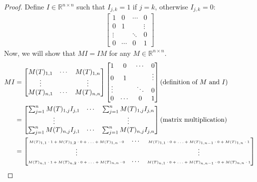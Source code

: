 \documentclass[12pt,reqno]{article}
\theoremstyle{definition}
\begin{document}
\begin{proof}
    Define $I \in \mathbb{R}^{n\times n}$ such that $I_{j,k} = 1$ if $j = k$, otherwise $I_{j,k} = 0$:
    \begin{align*}
        \begin{bmatrix}
            1 & 0 & \cdots & 0\\
            0 & 1 & & \vdots \\
            \vdots &  & \ddots & 0\\
            0 & \cdots & 0 & 1
        \end{bmatrix}
    \end{align*}
    Now, we will show that $MI=IM$ for any $M \in \mathbb{R}^{n\times n}$.
    \begin{align*}
        MI &=
        \begin{bmatrix}
            M(T)_{1,1} & \cdots & M(T)_{1,n}\\
            \vdots & & \vdots\\
            M(T)_{n,1} & \cdots & M(T)_{n,n}
        \end{bmatrix}
        \begin{bmatrix}
            1 & 0 & \cdots & 0\\
            0 & 1 & & \vdots \\
            \vdots &  & \ddots & 0\\
            0 & \cdots & 0 & 1
        \end{bmatrix}
        \text{(definition of $M$ and $I$)}\\
        &=
        \begin{bmatrix}
            \sum_{j=1}^{n}M(T)_{1,j}I_{j,1} & \cdots & \sum_{j=1}^{n}M(T)_{1,j}I_{j,n}\\
            \vdots & & \vdots \\
            \sum_{j=1}^{n}M(T)_{n,j}I_{j,1} & \cdots & \sum_{j=1}^{n}M(T)_{n,j}I_{j,n}
        \end{bmatrix}
        \text{(matrix multiplication)}\\
        &=
        \begin{bmatrix}
            \text{\tiny{$M(T)_{1,1}\cdot 1+M(T)_{1,2}\cdot 0+\ldots+M(T)_{1,n}\cdot 0$}} & \cdots & \text{\tiny{$M(T)_{1,1}\cdot 0+\ldots+M(T)_{1,n-1}\cdot 0+M(T)_{1,n}\cdot 1$}}\\
            \vdots & & \vdots \\
            \text{\tiny{$M(T)_{n,1}\cdot 1+M(T)_{n,2}\cdot 0+\ldots+M(T)_{n,n}\cdot 0$}} & \cdots & \text{\tiny{$M(T)_{n,1}\cdot 0+\ldots+M(T)_{n,n-1}\cdot 0+M(T)_{n,n}\cdot 1$}}

\end{bmatrix}
\end{align*}
\end{proof}
\end{document}
